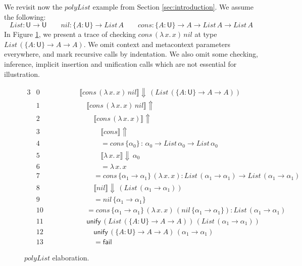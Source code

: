 \documentclass[acmsmall,review,anonymous,prologue,dvipsnames]{acmart}\settopmatter{printfolios=true,printccs=false,printacmref=false}
\renewcommand{\U}{\mathsf{U}}
\newcommand{\unify}{\mathsf{unify}}
\newcommand{\fail}{\mathsf{fail}}
\newcommand{\mi}[1]{\mathit{#1}}
\newcommand{\echeckt}[2]{\llbracket#1\rrbracket\!\Downarrow\,#2}
\newcommand{\einfert}[1]{\llbracket#1\rrbracket\!\Uparrow}
\theoremstyle{remark}
\begin{document}
We revisit now the $polyList$ example from Section \ref{sec:introduction}. We
assume the following:
\[
List : \U \to \U \qquad nil : \{A : \U\} \to List\,A \qquad
cons : \{A : \U\} \to A \to List\,A \to List\,A
\]
In Figure \ref{fig:polylist}, we present a trace of checking $cons\,(\lambda\,x.\,x)\,nil$
at type $List\,(\{A : \U\}\to A \to A)$. We omit context and metacontext
parameters everywhere, and mark recursive calls by indentation. We also omit
some checking, inference, implicit insertion and unification calls which are not
essential for illustration.

\begin{figure}
\begin{alignat*}{3}
  & \scriptstyle{0 }\qquad\qquad && \echeckt{cons\,(\lambda\,x.\,x)\,\mi{nil}}{(\mi{List}\,(\{A : \U\}\to A \to A))}
     \hspace{14em}\\
  & \scriptstyle{1 }  && \quad \einfert{\mi{cons}\,(\lambda\,x.\,x)\,\mi{nil}} \\
  & \scriptstyle{2 }  && \qquad \einfert{\mi{cons}\,(\lambda\,x.\,x)}\\
  & \scriptstyle{3 }  && \qquad\quad \einfert{\mi{cons}}\\
  & \scriptstyle{4 }  && \qquad\quad = \mi{cons}\,\{\alpha_0\}\,:\,\alpha_0 \to \mi{List}\,\alpha_0 \to \mi{List}\,\alpha_0\\
  & \scriptstyle{5 }  && \qquad\quad \echeckt{\lambda\,x.\,x}{\alpha_0}\\
  & \scriptstyle{6 }  && \qquad\quad = \lambda\,x.\,x\\
  & \scriptstyle{7 }  && \qquad = \mi{cons}\,\{\alpha_1 \to \alpha_1\}\,(\lambda\,x.\,x) : \mi{List}\,(\alpha_1\to\alpha_1) \to \mi{List}\,(\alpha_1\to\alpha_1)\\
  & \scriptstyle{8 }  && \qquad \echeckt{\mi{nil}}{(\mi{List}\,(\alpha_1\to\alpha_1))}\\
  & \scriptstyle{9 }  && \qquad = \mi{nil}\,\{\alpha_1\to\alpha_1\}\\
  & \scriptstyle{10} && \quad = \mi{cons}\,\{\alpha_1 \to \alpha_1\}\,(\lambda\,x.\,x)\,(\mi{nil}\,\{\alpha_1\to\alpha_1\}): \mi{List}\,(\alpha_1\to\alpha_1)\\
  & \scriptstyle{11} && \quad \unify\,(\mi{List}\,(\{A : \U\}\to A \to A))\,(\mi{List}\,(\alpha_1\to\alpha_1))\\
  & \scriptstyle{12} && \qquad \unify\,(\{A : \U\}\to A \to A)\,(\alpha_1\to\alpha_1)\\
  & \scriptstyle{13} && \qquad = \fail
\end{alignat*}
\caption{$\mi{polyList}$ elaboration.}
\label{fig:polylist}
\end{figure}
\end{document}

